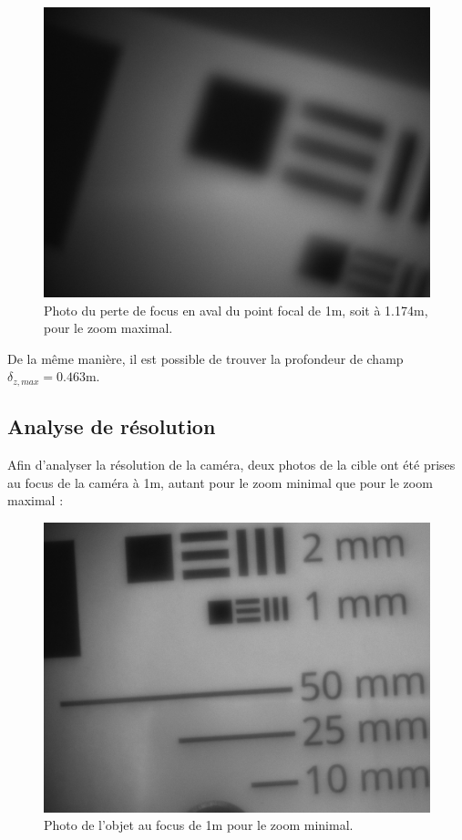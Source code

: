 \documentclass[11pt,letterpaper]{article}
\begin{document}
\begin{figure}[H]
  \centering
  \includegraphics[scale=0.3]{prof_1.174_max.png}
  \caption{Photo du perte de focus en aval du point focal de 1m, soit à 1.174m,
  pour le zoom maximal.}
  \label{prof_arr_max}
\end{figure}

De la même manière, il est possible de trouver la profondeur de champ 
$\delta_{z,max}= 0.463$m.


\subsection{Analyse de résolution}
 
Afin d'analyser la résolution de la caméra, deux photos de la cible ont été prises
au focus de la caméra à 1m, autant pour le zoom minimal que pour le zoom maximal :

\begin{figure}[H]
  \centering
  \includegraphics[scale=0.3]{res_1m_min.png}
  \caption{Photo de l'objet au focus de 1m pour le zoom minimal.}
  \label{res_min}
\end{figure}
\end{document}
